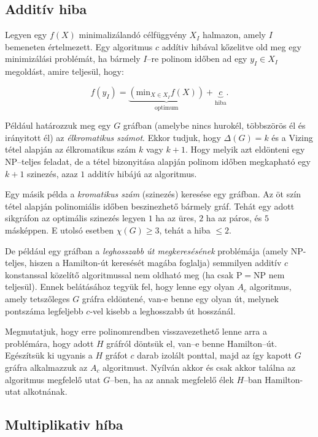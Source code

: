 \subsection{Additív hiba}

Legyen egy $f(X)$ minimalizálandó célfüggvény $X_I$ halmazon, amely $I$ bemeneten 
értelmezett. Egy algoritmus $c$ addítiv hibával kőzelitve old meg egy minimizálási 
problémát, ha bármely $I$--re polinom időben ad egy $y_I \in X_I$ megoldást, amire teljesül, hogy:

\[
f(y_I) = \underbrace{(\mbox{min}_{X \in X_I} f(X))}_{\mbox{optimum}} + \underbrace{c}_{\mbox{hiba}}.
\]

Például  határozzuk meg egy $G$ gráfban (amelybe nincs hurokél, többszörös él és
irányitott él) az \emph{élkromatikus számot}. Ekkor tudjuk, hogy $\Delta(G)=k$ és a
Vizing tétel alapján az élkromatikus szám $k$ vagy $k+1$. Hogy melyik azt
eldönteni egy NP--teljes feladat, de a tétel bizonyitása alapján polinom időben
megkapható egy $k+1$ szinezés, azaz $1$ additív hibájú az algoritmus.

Egy másik példa a \emph{kromatikus szám} (szinezés) keresése egy gráfban. Az öt szín
tétel alapján polinomiális időben beszinezhető bármely gráf. Tehát egy adott
sikgráfon az optimális szinezés legyen $1$ ha az üres, $2$ ha az páros, és $5$
másképpen. E utolsó esetben $\chi(G) \geq 3$, tehát a hiba $\leq 2$.

De például egy gráfban a \emph{leghosszabb út megkeresésének} problémája (amely
NP-teljes, hiszen a Hamilton-út keresését magába foglalja) semmilyen additív $c$
konstanssal közelítő algoritmussal nem oldható meg (ha csak P$=$NP nem teljesül). 
Ennek belátásához tegyük fel, hogy lenne egy olyan $A_c$ algoritmus, amely
tetszőleges $G$ gráfra eldöntené, van-e benne egy olyan út, melynek pontszáma
legfeljebb $c$-vel kisebb a leghosszabb út hosszánál.

Megmutatjuk, hogy erre polinomrendben visszavezethető lenne arra a problémára,
hogy adott $H$ gráfról döntsük el, van--e benne Hamilton--út. Egészítsük ki
ugyanis a $H$ gráfot $c$ darab izolált ponttal, majd az így kapott $G$ gráfra
alkalmazzuk az $A_c$ algoritmust. Nyílván akkor és csak akkor találna az
algoritmus megfelelő utat $G$--ben, ha az annak megfelelő élek $H$--ban
Hamilton-utat alkotnának.

\subsection{Multiplikativ híba}

